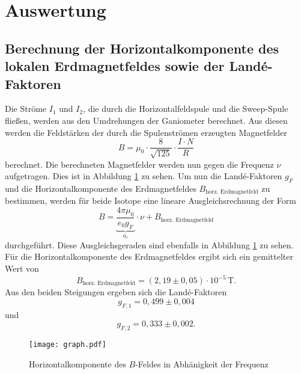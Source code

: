 \section{Auswertung}

\subsection{Berechnung der Horizontalkomponente des lokalen Erdmagnetfeldes sowie der Landé-Faktoren}
Die Ströme $I_1$ und $I_2$, die durch die Horizontalfeldspule und die Sweep-Spule fließen, werden aus den Umdrehungen der Ganiometer berechnet.
Aus diesen werden die Feldstärken der durch die Spulenströmen erzeugten Magnetfelder
\begin{equation}
  B= \mu_0 \cdot  \frac{8}{\sqrt {125}}\cdot \frac{I\cdot N}{R}
\end{equation}
berechnet.
Die berechneten Magnetfelder werden nun gegen die Frequenz $\nu$ aufgetragen.
Dies ist in Abbildung \ref{abb:graph} zu sehen.
Um nun die Landé-Faktoren $g_F$ und die Horizontalkomponente des Erdmagnetfeldes $B_\text{horz. Erdmagnetfeld}$ zu bestimmen, werden für beide Isotope eine lineare Ausgleichsrechnung der Form
\begin{equation}
  B=\underbrace{\frac{4\pi \mu_0}{e_0g_F}}_{a_i}\cdot \nu+B_\text{horz. Erdmagnetfeld}
\end{equation}
durchgeführt.
Diese Ausgleichsgeraden sind ebenfalls in Abbildung \ref{abb:graph} zu sehen.
Für die Horizontalkomponente des Erdmagnetfeldes ergibt sich ein gemittelter Wert von
\begin{equation}
  B_\text{horz. Erdmagnetfeld}=(2,19\pm0,05)\cdot 10^{-5}\,\text{T}.
\end{equation}
Aus den beiden Steigungen ergeben sich die Landé-Faktoren
\begin{equation}
  g_{F,1}=0,499\pm0,004
\end{equation}
und
\begin{equation}
  g_{F,2}=0,333\pm0,002.
\end{equation}


\begin{figure}[H]
 \centering
 \texttt{[image: graph.pdf]}
 \caption{Horizontalkomponente des $B$-Feldes in Abhänigkeit der Frequenz}
 \label{abb:graph}
\end{figure}
